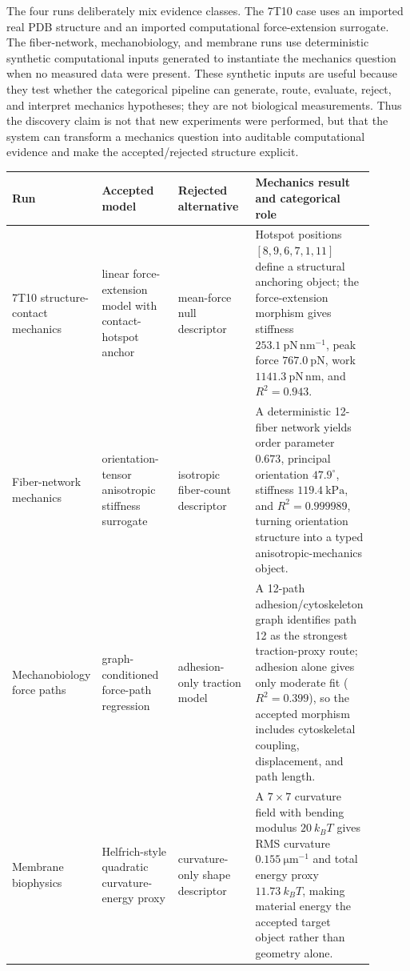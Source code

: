 \documentclass[11pt]{article}
\theoremstyle{definition}
\begin{document}
The four runs deliberately mix evidence classes. The 7T10 case uses an imported real PDB structure and an imported computational force-extension surrogate. The fiber-network, mechanobiology, and membrane runs use deterministic synthetic computational inputs generated to instantiate the mechanics question when no measured data were present. These synthetic inputs are useful because they test whether the categorical pipeline can generate, route, evaluate, reject, and interpret mechanics hypotheses; they are not biological measurements. Thus the discovery claim is not that new experiments were performed, but that the system can transform a mechanics question into auditable computational evidence and make the accepted/rejected structure explicit.

\begin{table}[t]
\centering
\footnotesize
\setlength{\tabcolsep}{3pt}
\begin{tabular}{@{}>{\raggedright\arraybackslash}p{0.17\linewidth}>{\raggedright\arraybackslash}p{0.22\linewidth}>{\raggedright\arraybackslash}p{0.22\linewidth}>{\raggedright\arraybackslash}p{0.29\linewidth}@{}}
\toprule
Run & Accepted model & Rejected alternative & Mechanics result and categorical role \\
\midrule
7T10 structure-contact mechanics & linear force-extension model with contact-hotspot anchor & mean-force null descriptor & Hotspot positions $[8,9,6,7,1,11]$ define a structural anchoring object; the force-extension morphism gives stiffness $253.1~\mathrm{pN\,nm^{-1}}$, peak force $767.0~\mathrm{pN}$, work $1141.3~\mathrm{pN\,nm}$, and $R^2=0.943$. \\
Fiber-network mechanics & orientation-tensor anisotropic stiffness surrogate & isotropic fiber-count descriptor & A deterministic 12-fiber network yields order parameter $0.673$, principal orientation $47.9^\circ$, stiffness $119.4~\mathrm{kPa}$, and $R^2=0.999989$, turning orientation structure into a typed anisotropic-mechanics object. \\
Mechanobiology force paths & graph-conditioned force-path regression & adhesion-only traction model & A 12-path adhesion/cytoskeleton graph identifies path 12 as the strongest traction-proxy route; adhesion alone gives only moderate fit ($R^2=0.399$), so the accepted morphism includes cytoskeletal coupling, displacement, and path length. \\
Membrane biophysics & Helfrich-style quadratic curvature-energy proxy & curvature-only shape descriptor & A $7\times7$ curvature field with bending modulus $20~k_B T$ gives RMS curvature $0.155~\mathrm{\mu m^{-1}}$ and total energy proxy $11.73~k_B T$, making material energy the accepted target object rather than geometry alone. \\

\end{tabular}
\end{table}
\end{document}

